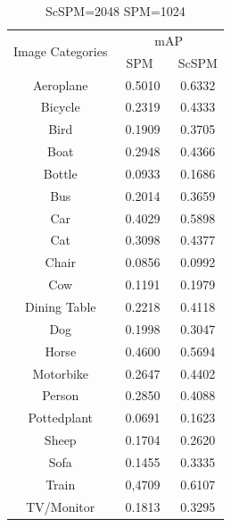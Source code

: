 \documentclass[conference]{IEEEtran}
\begin{document}
\begin{table}[ph]
  \centering
  \begin{tabular}{|c|c|c|}
    \hline
    \multirow{2}{*}{Image Categories} & \multicolumn{2}{c|}{mAP} \\
    \cline{2-3}
               & \ SPM\ \ & ScSPM \\
    \hline
     Aeroplane & 0.5010 & 0.6332 \\
    \hline
     Bicycle & 0.2319 & 0.4333 \\
     \hline
     Bird & 0.1909 & 0.3705 \\
     \hline
     Boat & 0.2948 & 0.4366 \\
     \hline
     Bottle & 0.0933 & 0.1686 \\
     \hline
     Bus & 0.2014 & 0.3659 \\
     \hline
     Car & 0.4029 & 0.5898 \\
     \hline
     Cat & 0.3098 & 0.4377 \\
     \hline
     Chair & 0.0856 & 0.0992 \\
     \hline
     Cow & 0.1191 & 0.1979 \\
     \hline
     Dining Table & 0.2218 & 0.4118 \\
     \hline
     Dog & 0.1998 & 0.3047 \\
     \hline
     Horse & 0.4600 & 0.5694 \\
     \hline
     Motorbike & 0.2647 & 0.4402 \\
     \hline
     Person & 0.2850 & 0.4088 \\
    \hline
     Pottedplant & 0.0691 & 0.1623 \\
     \hline
     Sheep & 0.1704 & 0.2620 \\
     \hline
     Sofa & 0.1455 & 0.3335 \\
     \hline
     Train & 0,4709 & 0.6107 \\
     \hline
     TV/Monitor & 0.1813 & 0.3295 \\
     \hline
  \end{tabular}
  \caption{ ScSPM=2048 SPM=1024 }
  \label{tablo}
\end{table}







\end{document}
